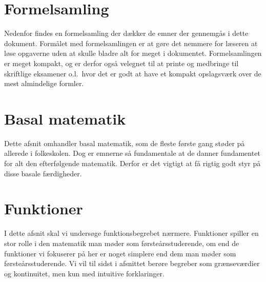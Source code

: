 \chapter{Formelsamling}
Nedenfor findes en formelsamling der dækker de emner der gennemgås i dette dokument. Formålet med formelsamlingen er at gøre det nemmere for læseren at løse opgaverne uden at skulle bladre alt for meget i dokumentet. Formelsamlingen er meget kompakt, og er derfor også velegnet til at printe og medbringe til skriftlige eksamener o.l.\ hvor det er godt at have et kompakt opslagsværk over de mest almindelige formler. 
{ 
    \fontsize{8pt}{0.5pt}\selectfont
    \setlength{\abovedisplayskip}{1pt}
    \setlength{\belowdisplayskip}{1pt}
    \pagestyle{empty}
    \setlength{\parindent}{0pt}
    \small
    \begin{multicols*}{3}
        
        
        
        
        
        
        
    \end{multicols*}
    }
\restoregeometry
{}
\chapter{Basal matematik}
Dette afsnit omhandler basal matematik, som de fleste første gang støder på allerede i folkeskolen. Dog er emnerne så fundamentale at de danner fundamentet for alt den efterfølgende matematik. Derfor er det vigtigt at få rigtig godt styr på disse basale færdigheder.


















\chapter{Funktioner}
I dette afsnit skal vi undersøge funktionsbegrebet nærmere. Funktioner spiller en stor rolle i den matematik man møder som førsteårsstuderende, om end de funktioner vi fokuserer på her er noget simplere end dem man møder som førsteårsstuderende. Vi vil til sidst i afsnittet berøre begreber som grænseværdier og kontinuitet, men kun med intuitive forklaringer. 



